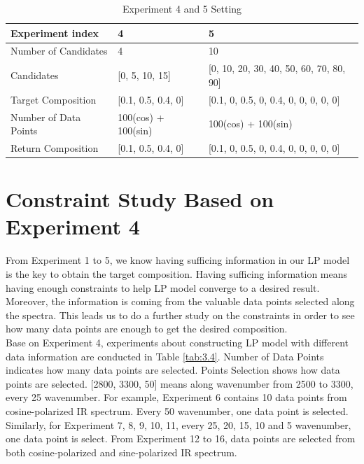 \begin{table} \label{tab:3.3}
\begin{center}
\begin{tabular}{| l | p{5cm} | l |}
\hline
Experiment index & 4 & 5\\
\hline
Number of Candidates & 4 & 10 \\
\hline
Candidates & [0, 5, 10, 15] & [0, 10, 20, 30, 40, 50, 60, 70, 80, 90] \\
\hline
Target Composition & [0.1, 0.5, 0.4, 0] & [0.1, 0, 0.5, 0, 0.4, 0, 0, 0, 0, 0]\\
\hline
Number of Data Points & 100(cos) + 100(sin) & 100(cos) + 100(sin)\\
\hline
Return Composition & [0.1, 0.5, 0.4, 0] & [0.1, 0, 0.5, 0, 0.4, 0, 0, 0, 0, 0] \\
\hline
\end{tabular} 
\caption{Experiment 4 and 5 Setting}
\end{center}
\end{table}		


\section{Constraint Study Based on Experiment 4}

From Experiment 1 to 5, we know having sufficing information in our LP model is the key to obtain the target composition. Having sufficing information means having enough constraints to help LP model converge to a desired result. Moreover, the information is coming from the valuable data points selected along the spectra. This leads us to do a further study on the constraints in order to see how many data points are enough to get the desired composition.\\ 

Base on Experiment 4, experiments about constructing LP model with different data information are conducted in Table \ref{tab:3.4}. Number of Data Points indicates how many data points are selected. Points Selection shows how data points are selected. [2800, 3300, 50] means along wavenumber from 2500 to 3300, every 25 wavenumber. For example, Experiment 6 contains 10 data points from cosine-polarized IR spectrum. Every 50 wavenumber, one data point is selected. Similarly, for Experiment 7, 8, 9, 10, 11, every 25, 20, 15, 10 and 5 wavenumber, one data point is select. From Experiment 12 to 16, data points are selected from both cosine-polarized and sine-polarized IR spectrum. \\

